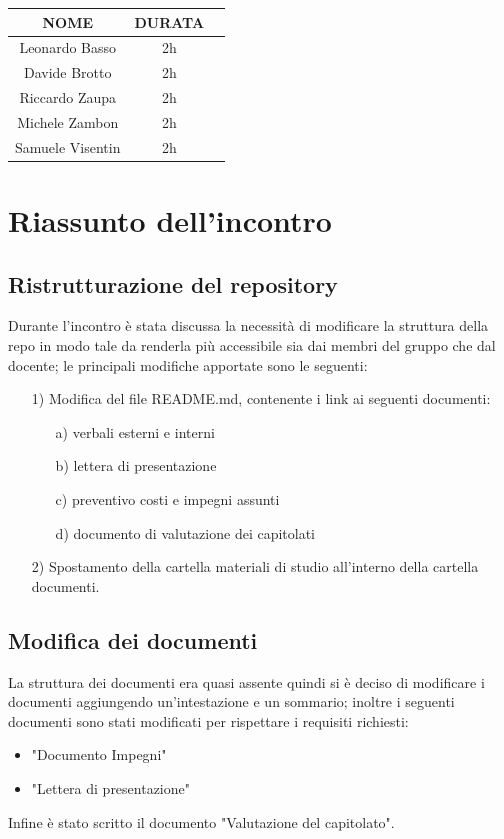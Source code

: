 \documentclass[12pt, oneside]{article}
\begin{document}
\begin{center}
	\begin{tabular}{ | c | c | c | }
		\hline
		NOME & DURATA \\ 
		\hline
		Leonardo Basso & 2h \\  
		\hline 
		Davide Brotto & 2h \\   
        \hline
        Riccardo Zaupa & 2h \\   
		\hline
        Michele Zambon & 2h \\   
        \hline
        Samuele Visentin & 2h \\
        \hline
	\end{tabular}
\end{center}

\section{Riassunto dell'incontro}
\subsection{Ristrutturazione del repository}
Durante l’incontro è stata discussa la necessità di modificare la struttura della repo in modo tale da renderla più accessibile sia dai membri del gruppo che dal docente; le principali modifiche apportate sono le seguenti:
\begin{itemize}
    \item[1)] Modifica del file README.md, contenente i link ai seguenti documenti:
    \begin{itemize}
        \item[a)] verbali esterni e interni
        \item[b)] lettera di presentazione
        \item[c)] preventivo costi e impegni assunti
        \item[d)] documento di valutazione dei capitolati
    \end{itemize}
    \item[2)] Spostamento della cartella materiali di studio all’interno della cartella documenti.
\end{itemize} 
\subsection{Modifica dei documenti}
La struttura dei documenti era quasi assente quindi si è deciso di modificare i documenti aggiungendo un'intestazione e un sommario; inoltre i seguenti documenti sono stati modificati per rispettare i requisiti richiesti:
\begin{itemize}
    \item "Documento Impegni"
    \item "Lettera di presentazione"
\end{itemize}
Infine è stato scritto il documento "Valutazione del capitolato".
\end{document}
